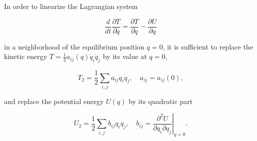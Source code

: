 In order to linearize the Lagrangian system

$$\frac{d}{dt} \frac{\partial T}{\partial \dot{q}} = \frac{\partial T}{\partial q} - \frac{\partial U}{\partial q}$$

in a neighborhood of the equilibrium position $q = 0$, it is sufficient to replace the kinetic energy $T = \frac{1}{2} a_{ij}(q) \dot{q}_i \dot{q}_j$ by its value at $q = 0$,

$$T_2 = \frac{1}{2} \sum_{i,j} a_{ij} \dot{q}_i \dot{q}_j, \quad a_{ij} = a_{ij}(0),$$

and replace the potential energy $U(q)$ by its quadratic part

$$U_2 = \frac{1}{2} \sum_{i,j} b_{ij} q_i q_j, \quad b_{ij} = \left. \frac{\partial^2 U}{\partial q_i \partial q_j} \right|_{q=0}.$$
